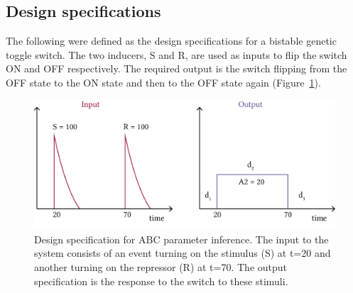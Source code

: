 \begin{table}[t]
\centering
\caption{The prior distributions used for the standard toggle switch parameter inference. The values indicate the lower and upper limits (inclusive) of a uniform distribution.}
\label{tab:param_inf_params}
\centerfloat
{}
\end{table}

\subsection{Design specifications}

The following were defined as the design specifications for a bistable genetic toggle switch. The two inducers, S and R, are used as inputs to flip the switch ON and OFF respectively. The required output is the switch flipping from the OFF state to the ON state and then to the OFF state again (Figure~\ref{fig:abc_behav}). 


\begin{figure}[htbp]
	\begin{center}
\includegraphics[scale=0.7]{../../chapters/chapterABCSysBio/images/behaviour.png}
\caption[Design specification for ABC parameter inference]{\label{fig:abc_behav}Design specification for ABC parameter inference. The input to the system consists of an event turning on the stimulus (S) at t=20 and another turning on the repressor (R) at t=70. The output specification is the response to the switch to these stimuli.}
\end{center}
\end{figure}

